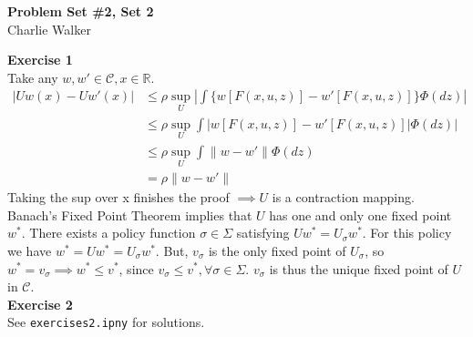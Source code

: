 \documentclass[letterpaper,12pt]{article}
\theoremstyle{definition}
\begin{document}
\begin{flushleft}
  \textbf{\large{Problem Set \#2, Set 2}} \\
  Charlie Walker
\end{flushleft}

\vspace{5mm}

\noindent\textbf{Exercise 1}\\
Take any $w, w' \in \mathscr{C}, x \in \mathbb{R}$. 
\begin{align*}
|Uw(x) - Uw'(x)| &\leq \rho\sup_U|\int\{w[F(x,u,z)]-w'[F(x,u,z)]\}\Phi(dz)|\\
&\leq \rho \sup_U \int|w[F(x,u,z)] - w'[F(x,u,z)]|\Phi(dz)|\\
&\leq \rho \sup_U \int\|w-w'\|\Phi(dz)\\
&= \rho \|w-w'\|
\end{align*}
Taking the sup over x finishes the proof $\implies U$ is a contraction mapping. Banach's Fixed Point Theorem implies that $U$ has one and only one fixed point $w^*$. There exists a policy function $\sigma \in \Sigma$ satisfying $Uw^* = U_\sigma w^*$. For this policy we have $w^* = Uw^* = U_\sigma w^*$. But, $v_\sigma$ is the only fixed point of $U_\sigma$, so $w^* = v_\sigma \implies w^* \leq v^*$, since $v_\sigma \leq v^*, \forall \sigma \in \Sigma$. $v_\sigma$ is thus the unique fixed point of $U$ in $\mathscr{C}$.\\

\noindent\textbf{Exercise 2}\\
See \texttt{exercises2.ipny} for solutions. 
\end{document}
